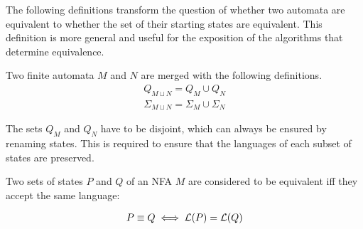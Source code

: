 The following definitions transform the question of
whether two automata are equivalent to
whether the set of their starting states are equivalent.
This definition is more general and useful
for the exposition of the algorithms that determine equivalence.

\begin{definition}
    Two finite automata $M$ and $N$ are merged with the following definitions.
    \begin{align}
        Q_{M \sqcup N} = Q_M \cup Q_N \\
        \Sigma_{M \sqcup N} = \Sigma_M \cup \Sigma_N
    \end{align}

    The sets $Q_M$ and $Q_N$ have to be disjoint, which
    can always be ensured by renaming states.
    This is required to ensure that the languages of each subset of states are preserved.
\end{definition}

\begin{definition}
    Two sets of states $P$ and $Q$ of an NFA $M$ are considered
    to be equivalent iff they accept the same language:

    \begin{align}
        P \equiv Q \iff \mathcal{L}(P) = \mathcal{L}(Q)
    \end{align}
\end{definition}
